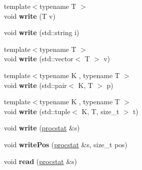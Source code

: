 \begin{DoxyCompactItemize}
\item 
\hypertarget{classfaster_1_1fastCommBuffer_ac70b22b40984e536be908ac6b57c06f1}{}{\footnotesize template$<$typename T $>$ }\\void {\bfseries write} (T v)\label{classfaster_1_1fastCommBuffer_ac70b22b40984e536be908ac6b57c06f1}

\item 
\hypertarget{classfaster_1_1fastCommBuffer_a5e472bea93ebc8e55a5c9312ecbd0592}{}void {\bfseries write} (std\+::string i)\label{classfaster_1_1fastCommBuffer_a5e472bea93ebc8e55a5c9312ecbd0592}

\item 
\hypertarget{classfaster_1_1fastCommBuffer_abd183153da65d51c42d69070a09da573}{}{\footnotesize template$<$typename T $>$ }\\void {\bfseries write} (std\+::vector$<$ T $>$ v)\label{classfaster_1_1fastCommBuffer_abd183153da65d51c42d69070a09da573}

\item 
\hypertarget{classfaster_1_1fastCommBuffer_a0a3d8c055a7c060f5a16b03390fc4cf3}{}{\footnotesize template$<$typename K , typename T $>$ }\\void {\bfseries write} (std\+::pair$<$ K, T $>$ p)\label{classfaster_1_1fastCommBuffer_a0a3d8c055a7c060f5a16b03390fc4cf3}

\item 
\hypertarget{classfaster_1_1fastCommBuffer_ae09a68a8815aa1f7a24a5fab133c34ca}{}{\footnotesize template$<$typename K , typename T $>$ }\\void {\bfseries write} (std\+::tuple$<$ K, T, size\+\_\+t $>$ t)\label{classfaster_1_1fastCommBuffer_ae09a68a8815aa1f7a24a5fab133c34ca}

\item 
\hypertarget{classfaster_1_1fastCommBuffer_a96461d57713b8184137257c6e045c0a1}{}void {\bfseries write} (\hyperlink{classfaster_1_1procstat}{procstat} \&s)\label{classfaster_1_1fastCommBuffer_a96461d57713b8184137257c6e045c0a1}

\item 
\hypertarget{classfaster_1_1fastCommBuffer_a58ca907f93b412801d9cc956510a2356}{}void {\bfseries write\+Pos} (\hyperlink{classfaster_1_1procstat}{procstat} \&s, size\+\_\+t pos)\label{classfaster_1_1fastCommBuffer_a58ca907f93b412801d9cc956510a2356}

\item 
\hypertarget{classfaster_1_1fastCommBuffer_af7dc758c4e8a09aa4e7d31396075c72a}{}void {\bfseries read} (\hyperlink{classfaster_1_1procstat}{procstat} \&s)\label{classfaster_1_1fastCommBuffer_af7dc758c4e8a09aa4e7d31396075c72a}


\end{DoxyCompactItemize}
